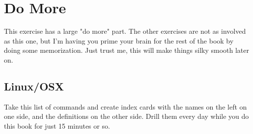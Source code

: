 \section{Do More}

This exercise has a large "do more" part.  The other exercises are not as involved as this one, but
I'm having you prime your brain for the rest of the book by doing some memorization.  Just trust me,
this will make things silky smooth later on.

\subsection{Linux/OSX}

Take this list of commands and create index cards with the names on the left
on one side, and the definitions on the other side.  Drill them every day while
you do this book for just 15 minutes or so.

